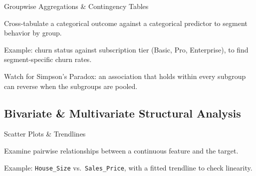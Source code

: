 \begin{frame}{Groupwise Aggregations \& Contingency Tables}
    \begin{sitemize}
        \item Cross-tabulate a categorical outcome against a categorical predictor to segment behavior by group.
        \item Example: churn status against subscription tier (Basic, Pro, Enterprise), to find segment-specific churn rates.
        \item Watch for Simpson's Paradox: an association that holds within every subgroup can reverse when the subgroups are pooled.
    \end{sitemize}
\end{frame}


\subsection{Bivariate \& Multivariate Structural Analysis}


\begin{frame}{Scatter Plots \& Trendlines}
    \begin{sitemize}
        \item Examine pairwise relationships between a continuous feature and the target.
        \item Example: \texttt{House\_Size} vs.\ \texttt{Sales\_Price}, with a fitted trendline to check linearity.
    \end{sitemize}
    \begin{figure}
        \centering
    \end{figure}
\end{frame}


